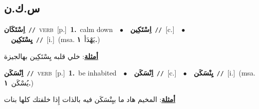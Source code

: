 \documentclass[10pt,a4paper,twoside]{article} %
\begin{document}
\begin{multicols}{2}
\vspace{-3mm}
\subsection*{\color{blue}\foreignlanguage{arabic}{س.ك.ن}\color{blue}{}} 

{\setlength\topsep{0pt}\textbf{\foreignlanguage{arabic}{اِسْتَكَان}}\ {\color{gray}\texttt{//}\color{black}}\ \textsc{verb}\ [p.]\ \textbf{1.}~calm down\ \ $\bullet$\ \ \setlength\topsep{0pt}\textbf{\foreignlanguage{arabic}{اِسْتَكِين}}\ {\color{gray}\texttt{//}\color{black}}\ [c.]\ \ $\bullet$\ \ \setlength\topsep{0pt}\textbf{\foreignlanguage{arabic}{يِسْتَكِين}}\ {\color{gray}\texttt{//}\color{black}}\ [i.]\ \color{gray}(msa. \foreignlanguage{arabic}{يَهْدَأ}~\foreignlanguage{arabic}{\textbf{١.}})\color{black}\  \begin{flushright}\color{gray}\foreignlanguage{arabic}{\textbf{\underline{\foreignlanguage{arabic}{أمثلة}}}: خلي قلبه يِسْتَكِين بهالجيزة}\end{flushright}\color{black}} \vspace{2mm}

{\setlength\topsep{0pt}\textbf{\foreignlanguage{arabic}{اِنْسَكَن}}\ {\color{gray}\texttt{//}\color{black}}\ \textsc{verb}\ [p.]\ \textbf{1.}~be inhabited\ \ $\bullet$\ \ \setlength\topsep{0pt}\textbf{\foreignlanguage{arabic}{اِنْسَكَن}}\ {\color{gray}\texttt{//}\color{black}}\ [c.]\ \ $\bullet$\ \ \setlength\topsep{0pt}\textbf{\foreignlanguage{arabic}{يِنْسَكَن}}\ {\color{gray}\texttt{//}\color{black}}\ [i.]\ \color{gray}(msa. \foreignlanguage{arabic}{يُسْكَن}~\foreignlanguage{arabic}{\textbf{١.}})\color{black}\  \begin{flushright}\color{gray}\foreignlanguage{arabic}{\textbf{\underline{\foreignlanguage{arabic}{أمثلة}}}: المخيم هاد ما بيِنْسَكَن فيه بالذات إِذا خلفتك كلها بنات}\end{flushright}\color{black}} \vspace{2mm}


\end{multicols}
\end{document}
